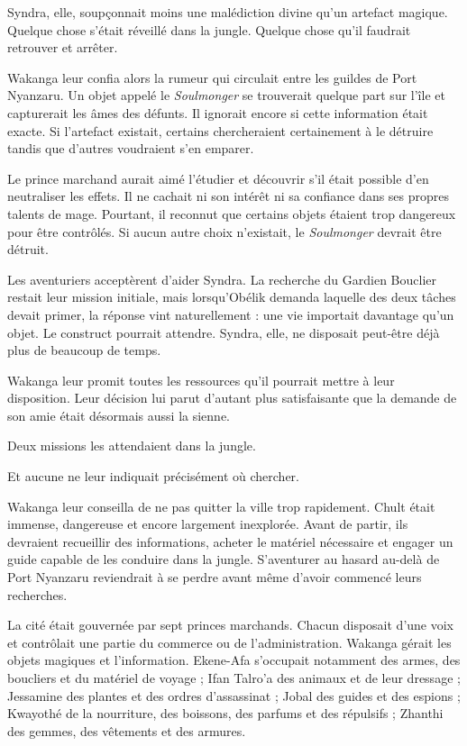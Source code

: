 Syndra, elle, soupçonnait moins une malédiction divine qu'un artefact magique. Quelque chose s'était réveillé dans la jungle. Quelque chose qu'il faudrait retrouver et arrêter.

Wakanga leur confia alors la rumeur qui circulait entre les guildes de Port Nyanzaru. Un objet appelé le \textit{Soulmonger} se trouverait quelque part sur l'île et capturerait les âmes des défunts. Il ignorait encore si cette information était exacte. Si l'artefact existait, certains chercheraient certainement à le détruire tandis que d'autres voudraient s'en emparer.

Le prince marchand aurait aimé l'étudier et découvrir s'il était possible d'en neutraliser les effets. Il ne cachait ni son intérêt ni sa confiance dans ses propres talents de mage. Pourtant, il reconnut que certains objets étaient trop dangereux pour être contrôlés. Si aucun autre choix n'existait, le \textit{Soulmonger} devrait être détruit.

Les aventuriers acceptèrent d'aider Syndra. La recherche du Gardien Bouclier restait leur mission initiale, mais lorsqu'Obélik demanda laquelle des deux tâches devait primer, la réponse vint naturellement : une vie importait davantage qu'un objet. Le construct pourrait attendre. Syndra, elle, ne disposait peut-être déjà plus de beaucoup de temps.

Wakanga leur promit toutes les ressources qu'il pourrait mettre à leur disposition. Leur décision lui parut d'autant plus satisfaisante que la demande de son amie était désormais aussi la sienne.

Deux missions les attendaient dans la jungle.

Et aucune ne leur indiquait précisément où chercher.

\scenebreak

Wakanga leur conseilla de ne pas quitter la ville trop rapidement. Chult était immense, dangereuse et encore largement inexplorée. Avant de partir, ils devraient recueillir des informations, acheter le matériel nécessaire et engager un guide capable de les conduire dans la jungle. S'aventurer au hasard au-delà de Port Nyanzaru reviendrait à se perdre avant même d'avoir commencé leurs recherches.

La cité était gouvernée par sept princes marchands. Chacun disposait d'une voix et contrôlait une partie du commerce ou de l'administration. Wakanga gérait les objets magiques et l'information. Ekene-Afa s'occupait notamment des armes, des boucliers et du matériel de voyage ; Ifan Talro'a des animaux et de leur dressage ; Jessamine des plantes et des ordres d'assassinat ; Jobal des guides et des espions ; Kwayothé de la nourriture, des boissons, des parfums et des répulsifs ; Zhanthi des gemmes, des vêtements et des armures.

